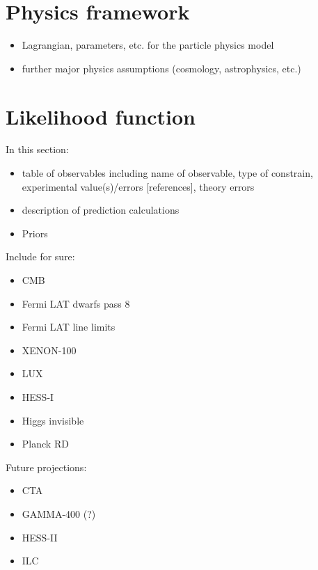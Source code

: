 \section{Physics framework}
\label{phys}


\begin{itemize}
           \item Lagrangian, parameters, etc. for the particle physics model
           \item further major physics assumptions (cosmology, astrophysics, etc.)
\end{itemize}



\section{Likelihood function}
\label{lnL}

In this section:
\begin{itemize}
  \item table of observables including name of observable, type of constrain,
    experimental value(s)/errors [references], theory errors
  \item description of prediction calculations
  \item Priors
\end{itemize}

Include for sure:
\begin{itemize}
  \item CMB
  \item Fermi LAT dwarfs pass 8
  \item Fermi LAT line limits
  \item XENON-100
  \item LUX
  \item HESS-I
  \item Higgs invisible
  \item Planck RD
\end{itemize}

Future projections:
\begin{itemize}
  \item CTA
  \item GAMMA-400 (?)
  \item HESS-II
  \item ILC
\end{itemize}

